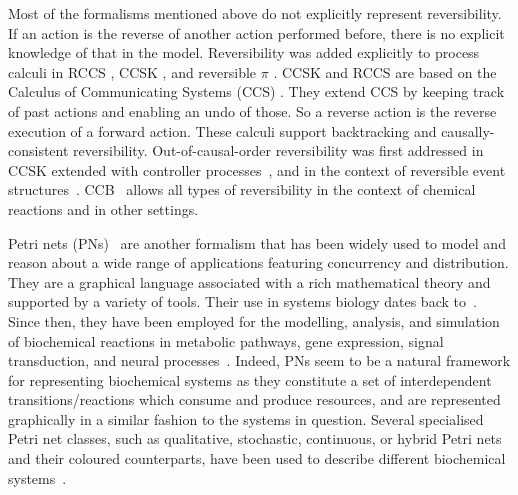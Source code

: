 \documentclass[runningheads]{llncs}
\begin{document}
Most of the formalisms mentioned above do not explicitly represent reversibility. If an action is 
the reverse of another action performed before, there is no explicit knowledge of that in the model. 
Reversibility was added explicitly to process calculi in
RCCS \cite{danos2004ccsr}, CCSK \cite{Irek2007}, and reversible 
$\pi$ \cite{Lanese_controllingreversibility,Lanese_controlled}. CCSK and RCCS are based on the Calculus of Communicating Systems (CCS) \cite{Milner1980}. They extend CCS by keeping track of past actions 
and enabling an undo of those. So a reverse action is the reverse execution of a forward action.
These calculi support backtracking and causally-consistent reversibility. 
Out-of-causal-order reversibility was first addressed in CCSK extended with controller 
processes~\cite{Irek2012}, and in the context of reversible event 
structures~\cite{Irek2013,irekconcur2013,irekNGC2018}. 
CCB~\cite{KUHN201818} allows all types of reversibility in the context of chemical reactions and in
other settings.

Petri nets (PNs)~\cite{PNs} are another formalism that has been widely used to model and reason
about a wide range of applications featuring concurrency and distribution. They are a graphical 
language  associated with 
a rich mathematical theory and supported by a variety of tools. Their use in systems 
biology dates back to~\cite{DBLP:conf/ismb/ReddyML93,DBLP:journals/jsamas/HofestadtH94}.
Since then, they have been employed for
the modelling, analysis, and simulation of 
biochemical reactions in metabolic pathways, gene expression, signal transduction, and neural 
processes~\cite{PNbiology,DBLP:journals/bib/Chaouiya07,DBLP:journals/nc/BaldanCMS10}. 
Indeed, PNs seem to be a natural framework for representing biochemical systems as they constitute a set of interdependent
transitions/reactions which consume 
and produce resources, and are represented graphically in a similar fashion to the systems
in question.
Several specialised Petri net classes, such as qualitative, stochastic, continuous, or
hybrid Petri nets and their coloured counterparts, have been used to describe different biochemical 
systems~\cite{DBLP:journals/jamia/PelegRA05,DBLP:journals/isb/HofestadtT98,DBLP:journals/fuin/Popova-ZeugmannHK05,DBLP:journals/nc/MatsunoNM11,DBLP:journals/isb/VossHK03}.
\end{document}
